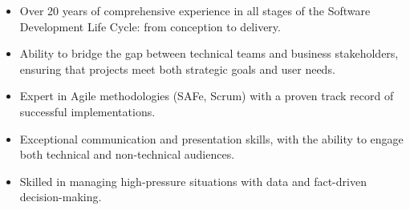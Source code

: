 \documentclass[10pt,a4paper]{altacv}
\begin{document}

\begin{fullwidth}
\makecvheader
\end{fullwidth}

\begin{itemize} 
	\item Over 20 years of comprehensive experience in all stages of the Software Development Life Cycle: from conception to delivery.
	\item Ability to bridge the gap between technical teams and business stakeholders, ensuring that projects meet both strategic goals and user needs.
	\item Expert in Agile methodologies (SAFe, Scrum) with a proven track record of successful implementations.	       
	\item Exceptional communication and presentation skills, with the ability to engage both technical and non-technical audiences.
	\item Skilled in managing high-pressure situations with data and fact-driven decision-making.
\end{itemize}

\medskip

\end{document}
